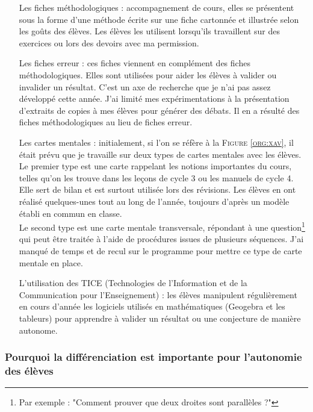 \begin{itemize}
	\item [Les fiches méthodologiques :] accompagnement de cours, elles se présentent sous la forme d'une méthode écrite sur une fiche cartonnée et illustrée selon les goûts des élèves. Les élèves les utilisent lorsqu'ils travaillent sur des exercices ou lors des devoirs avec ma permission.
	\item [Les fiches erreur :] ces fiches viennent en complément des fiches méthodologiques. Elles sont utilisées pour aider les élèves à valider ou invalider un résultat. C'est un axe de recherche que je n'ai pas assez développé cette année. J'ai limité mes expérimentations à la présentation d'extraits de copies à mes élèves pour générer des débats. Il en a résulté des fiches méthodologiques au lieu de fiches erreur.
	\item [Les cartes mentales :] initialement, si l'on se réfère à la  \textsc{Figure \ref{org:xav}}, il était prévu que je travaille sur deux types de cartes mentales avec les élèves. Le premier type est une carte rappelant les notions importantes du cours, telles qu'on les trouve dans les leçons de cycle 3 ou les manuels de cycle 4. Elle sert de bilan et est surtout utilisée lors des révisions. Les élèves en ont réalisé quelques-unes tout au long de l'année, toujours d'après un modèle établi en commun en classe. \\
	Le second type est une carte mentale transversale, répondant à une question\footnote{Par exemple : "Comment prouver que deux droites sont parallèles ?"} qui peut être traitée à l'aide de procédures issues de plusieurs séquences. J'ai manqué de temps et de recul sur le programme pour mettre ce type de carte mentale en place.
	\item [L'utilisation des TICE] (Technologies de l'Information et de la Communication pour l'Enseignement) : les élèves manipulent régulièrement en cours d'année les logiciels utilisés en mathématiques (Geogebra et les tableurs) pour apprendre à valider un résultat ou une conjecture de manière autonome.
\end{itemize}

\subsubsection{Pourquoi la différenciation est importante pour l'autonomie des élèves}

